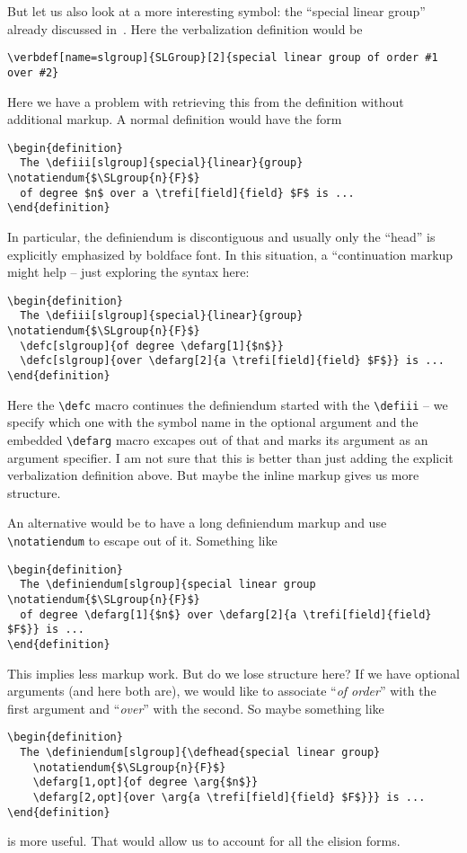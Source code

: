 \documentclass{bluenote}
\def\nlex#1{``\emph{#1}''}
\begin{document}
But let us also look at a more interesting symbol: the ``special linear group'' already
discussed in~\cite{Kohlhase:dmsmglom14}. Here the \sTeX verbalization definition would be 
\begin{lstlisting}
\verbdef[name=slgroup]{SLGroup}[2]{special linear group of order #1 over #2}
\end{lstlisting}
Here we have a problem with retrieving this from the definition without additional
markup. A normal definition would have the form
\begin{lstlisting}
\begin{definition}
  The \defiii[slgroup]{special}{linear}{group} \notatiendum{$\SLgroup{n}{F}$}
  of degree $n$ over a \trefi[field]{field} $F$ is ...
\end{definition}
\end{lstlisting}
In particular, the definiendum is discontiguous and usually only the ``head'' is
explicitly emphasized by boldface font. In this situation, a ``continuation markup might
help -- just exploring the syntax here:
\begin{lstlisting}
\begin{definition}
  The \defiii[slgroup]{special}{linear}{group} \notatiendum{$\SLgroup{n}{F}$}
  \defc[slgroup]{of degree \defarg[1]{$n$}} 
  \defc[slgroup]{over \defarg[2]{a \trefi[field]{field} $F$}} is ...
\end{definition}
\end{lstlisting}
Here the \lstinline|\defc| macro continues the definiendum started with the
\lstinline|\defiii| -- we specify which one with the symbol name in the optional argument
and the embedded \lstinline|\defarg| macro excapes out of that and marks its argument as
an argument specifier. I am not sure that this is better than just adding the explicit
verbalization definition above. But maybe the inline markup gives us more structure.

An alternative would be to have a long definiendum markup and use \lstinline|\notatiendum|
to escape out of it. Something like 
\begin{lstlisting}
\begin{definition}
  The \definiendum[slgroup]{special linear group \notatiendum{$\SLgroup{n}{F}$}
  of degree \defarg[1]{$n$} over \defarg[2]{a \trefi[field]{field} $F$}} is ...
\end{definition}
\end{lstlisting}
This implies less markup work. But do we lose structure here? If we have optional
arguments (and here both are), we would like to associate \nlex{of order} with the first
argument and \nlex{over} with the second. So maybe something like 
\begin{lstlisting}
\begin{definition}
  The \definiendum[slgroup]{\defhead{special linear group} 
    \notatiendum{$\SLgroup{n}{F}$}
    \defarg[1,opt]{of degree \arg{$n$}} 
    \defarg[2,opt]{over \arg{a \trefi[field]{field} $F$}}} is ...
\end{definition}
\end{lstlisting}
is more useful. That would allow us to account for all the elision forms.
\end{document}
